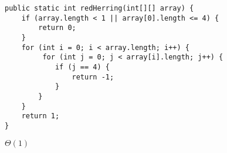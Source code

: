 \begin{blocksection}
\question
\begin{lstlisting}
public static int redHerring(int[][] array) {
    if (array.length < 1 || array[0].length <= 4) {
        return 0;
    }
    for (int i = 0; i < array.length; i++) {
         for (int j = 0; j < array[i].length; j++) {
            if (j == 4) {
                return -1;
            }
        }
    }
    return 1;
}
\end{lstlisting}

\begin{solution}
$\Theta(1)$
\end{solution}
\end{blocksection}
